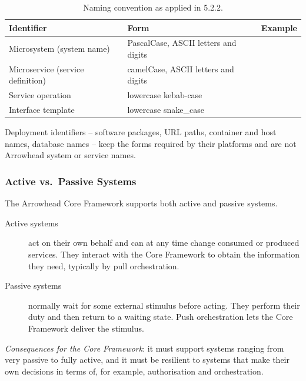 \documentclass[a4paper]{arrowhead}
\begin{document}
\begin{table}[h!]
\centering\footnotesize
\begin{tabularx}{\textwidth}{|P{4.4cm}|P{4.6cm}|Y|}\hline
{}Identifier & Form & Example \\\hline
Microsystem (system name) & PascalCase, ASCII letters and digits &  \\\hline
Microservice (service definition) & camelCase, ASCII letters and digits &  \\\hline
Service operation & lowercase kebab-case &  \\\hline
Interface template & lowercase snake\_case &  \\\hline
\end{tabularx}
\caption{Naming convention as applied in 5.2.2.}
\label{tab:naming}
\end{table}

Deployment identifiers -- software packages, URL paths, container and host names, database names
-- keep the forms required by their platforms and are not Arrowhead system or service names.

\subsubsection{Active vs.\ Passive Systems}
The Arrowhead Core Framework supports both active and passive systems.
\begin{description}
  \item[Active systems] act on their own behalf and can at any time change consumed or produced
        services. They interact with the Core Framework to obtain the information they need,
        typically by pull orchestration.
  \item[Passive systems] normally wait for some external stimulus before acting. They perform
        their duty and then return to a waiting state. Push orchestration lets the Core Framework
        deliver the stimulus.
\end{description}
\emph{Consequences for the Core Framework}: it must support systems ranging from very passive to
fully active, and it must be resilient to systems that make their own decisions in terms of,
for example, authorisation and orchestration.
\end{document}
